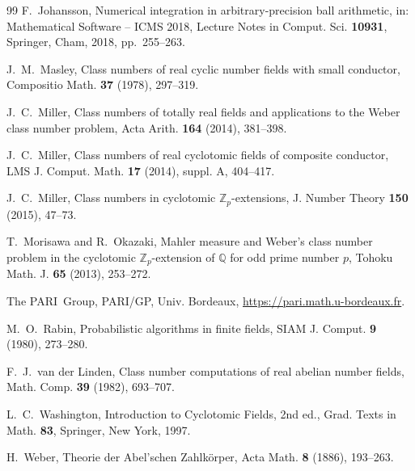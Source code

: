 \documentclass[11pt,a4paper]{ltjsarticle}
\theoremstyle{ja}
\begin{document}
\begin{thebibliography}{99}
 F.~Johansson, Numerical integration in arbitrary-precision ball arithmetic, in: Mathematical Software -- ICMS 2018, Lecture Notes in Comput. Sci. \textbf{10931}, Springer, Cham, 2018, pp.~255--263.

 J.~M.~Masley, Class numbers of real cyclic number fields with small conductor, Compositio Math. \textbf{37} (1978), 297--319.

 J.~C.~Miller, Class numbers of totally real fields and applications to the Weber class number problem, Acta Arith. \textbf{164} (2014), 381--398.

 J.~C.~Miller, Class numbers of real cyclotomic fields of composite conductor, LMS J. Comput. Math. \textbf{17} (2014), suppl. A, 404--417.

 J.~C.~Miller, Class numbers in cyclotomic $\mathbb{Z}_p$-extensions, J. Number Theory \textbf{150} (2015), 47--73.

 T.~Morisawa and R.~Okazaki, Mahler measure and Weber's class number problem in the cyclotomic $\mathbb{Z}_p$-extension of $\mathbb{Q}$ for odd prime number $p$, Tohoku Math. J. \textbf{65} (2013), 253--272.

 The PARI~Group, PARI/GP, Univ. Bordeaux, \url{https://pari.math.u-bordeaux.fr}.

 M.~O.~Rabin, Probabilistic algorithms in finite fields, SIAM J. Comput. \textbf{9} (1980), 273--280.

 F.~J.~van der Linden, Class number computations of real abelian number fields, Math. Comp. \textbf{39} (1982), 693--707.

 L.~C.~Washington, Introduction to Cyclotomic Fields, 2nd ed., Grad. Texts in Math. \textbf{83}, Springer, New York, 1997.

 H.~Weber, Theorie der Abel'schen Zahlk\"orper, Acta Math. \textbf{8} (1886), 193--263.

\end{thebibliography}
\end{document}

